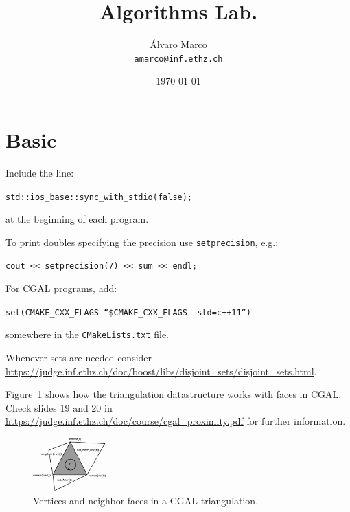 \documentclass[10pt,a4paper,landscape,twocolumn,twoside]{article}
\title{Algorithms Lab.}
\author{Álvaro Marco\\
		\texttt{amarco@inf.ethz.ch}
}
\date{\today}
\begin{document}
\maketitle

\tableofcontents

\section{Basic}
Include the line:
\begin{displayquote}
	\texttt{std::ios\_base::sync\_with\_stdio(false);}
\end{displayquote}
at the beginning of each program.

To print doubles specifying the precision use \texttt{setprecision}, e.g.:
\begin{displayquote}
	\texttt{cout << setprecision(7) << sum << endl;}
\end{displayquote}

For CGAL programs, add:
\begin{displayquote}
	\texttt{set(CMAKE\_CXX\_FLAGS ``\${CMAKE\_CXX\_FLAGS} -std=c++11'')}
\end{displayquote}
somewhere in the \texttt{CMakeLists.txt} file.

Whenever sets are needed consider \url{https://judge.inf.ethz.ch/doc/boost/libs/disjoint_sets/disjoint_sets.html}.

Figure~\ref{fig:neighbors} shows how the triangulation datastructure works with faces in CGAL. Check slides 19 and 20 in \url{https://judge.inf.ethz.ch/doc/course/cgal_proximity.pdf} for further information.

\begin{figure}[!ht]
\label{fig:neighbors}
	\centering
	\includegraphics[width=0.25\textwidth]{img/neighbors.png}
	\caption{Vertices and neighbor faces in a CGAL triangulation.}
\end{figure}
\end{document}
